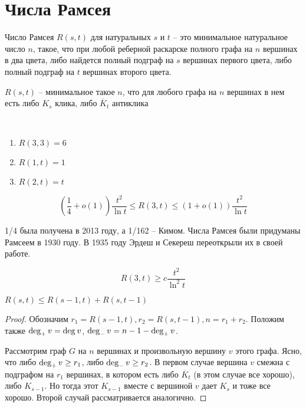 \documentclass[document.tex]{subfiles}
\begin{document}
\section{Числа Рамсея}
\begin{definition}
	Число Рамсея $R(s, t)$ для натуральных $s$ и $t$ -- это минимальное натуральное число $n$, такое, что при любой реберной раскарске полного графа на $n$ вершинах в два цвета, либо найдется полный подграф на $s$ вершинах первого цвета, либо полный подграф на $t$ вершинах второго цвета.
\end{definition}

\begin{definition}
	$R(s, t)$ -- минимальное такое $n$, что для любого графа на $n$ вершинах в нем есть либо $K_s$ клика, либо $\overline K_t$ антиклика
\end{definition}
\begin{example}
	~\begin{enumerate}
		\item $R(3, 3) = 6$
		\item $R(1, t) = 1$
		\item $R(2, t) = t$
	\end{enumerate}
\end{example}

\begin{statement}
	\[(
		\frac{1}{4} + o(1))\frac{t^2}{\ln t} \leq R(3, t) \leq (1 + o(1))\frac{t^2}{\ln t}
	\]
\end{statement}

\begin{remark}
	1/4 была получена в 2013 году, а 1/162 -- Кимом. Числа Рамсея были придуманы Рамсеем в 1930 году. В 1935 году Эрдеш и Секереш переоткрыли их в своей работе.
\end{remark}

\begin{statement}
	\[
		R(3, t) \geq c \frac{t^2}{\ln^2 t}
	\]
\end{statement}

\begin{theorem}
	$R(s, t) \leq R(s-1, t) + R(s, t-1)$
\end{theorem}

\begin{proof}
	Обозначим $r_1 = R(s - 1, t), r_2 = R(s, t - 1), n = r_1 + r_2$. Положим также $\operatorname{deg}_{+} v = \operatorname{deg}_{} v$, $\operatorname{deg}_{-} v = n - 1 - \operatorname{deg}_{+} v$.

	Рассмотрим граф $G$ на $n$ вершинах и произвольную вершину $v$ этого графа. Ясно, что либо $\operatorname{deg}_{+} v \geq r_1$, либо $\operatorname{deg}_{-} v \geq r_2$. В первом случае вершина $v$ смежна с подграфом на $r_1$ вершинах, в котором есть либо $\overline K_t$ (в этом случае все хорошо), либо $K_{s - 1}$. Но тогда этот $K_{s - 1}$ вместе с вершиной $v$ дает $K_s$ и тоже все хорошо. Второй случай рассматривается аналогично.
\end{proof}
\end{document}
